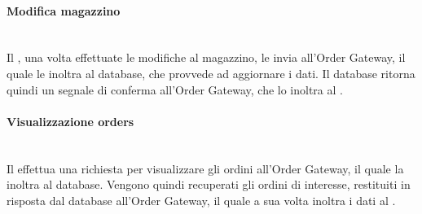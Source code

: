 \paragraph{Modifica magazzino}\mbox{}\\
Il \Manager{}, una volta effettuate le modifiche al magazzino, le invia all’Order Gateway, il quale le inoltra al database, che provvede ad aggiornare i dati. Il database ritorna quindi un segnale di conferma all’Order Gateway, che lo inoltra al \Manager{}.

\paragraph{Visualizzazione orders}\mbox{}\\
Il \Manager{} effettua una richiesta per visualizzare gli ordini all’Order Gateway, il quale la inoltra al database. Vengono quindi recuperati gli ordini di interesse, restituiti in risposta dal database all’Order Gateway, il quale a sua volta inoltra i dati al \Manager{}.

